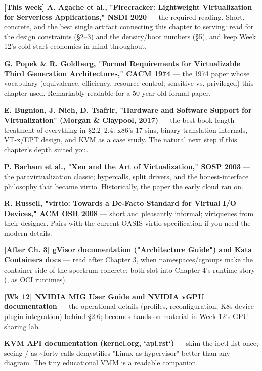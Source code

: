 \begin{tbbitemize}
  \item \textbf{[This week] A. Agache et al., "Firecracker: Lightweight Virtualization for Serverless Applications," NSDI 2020} — the required reading. Short, concrete, and the best single artifact connecting this chapter to serving: read for the design constraints (§2–3) and the density/boot numbers (§5), and keep Week 12's cold-start economics in mind throughout.
  \item \textbf{G. Popek \& R. Goldberg, "Formal Requirements for Virtualizable Third Generation Architectures," CACM 1974} — the 1974 paper whose vocabulary (equivalence, efficiency, resource control; sensitive vs. privileged) this chapter used. Remarkably readable for a 50-year-old formal paper.
  \item \textbf{E. Bugnion, J. Nieh, D. Tsafrir, "Hardware and Software Support for Virtualization" (Morgan \& Claypool, 2017)} — the best book-length treatment of everything in §2.2–2.4: x86's 17 sins, binary translation internals, VT-x/EPT design, and KVM as a case study. The natural next step if this chapter's depth suited you.
  \item \textbf{P. Barham et al., "Xen and the Art of Virtualization," SOSP 2003} — the paravirtualization classic; hypercalls, split drivers, and the honest-interface philosophy that became virtio. Historically, the paper the early cloud ran on.
  \item \textbf{R. Russell, "virtio: Towards a De-Facto Standard for Virtual I/O Devices," ACM OSR 2008} — short and pleasantly informal; virtqueues from their designer. Pairs with the current OASIS virtio specification if you need the modern details.
  \item \textbf{[After Ch. 3] gVisor documentation ("Architecture Guide") and Kata Containers docs} — read after Chapter 3, when namespaces/cgroups make the container side of the spectrum concrete; both slot into Chapter 4's runtime story (,  as OCI runtimes).
  \item \textbf{[Wk 12] NVIDIA MIG User Guide and NVIDIA vGPU documentation} — the operational details (profiles, reconfiguration, K8s device-plugin integration) behind §2.6; becomes hands-on material in Week 12's GPU-sharing lab.
  \item \textbf{KVM API documentation (kernel.org, `api.rst`)} — skim the ioctl list once; seeing  /  as \textasciitilde{}forty calls demystifies "Linux as hypervisor" better than any diagram. The tiny educational VMM  is a readable companion.

\end{tbbitemize}
